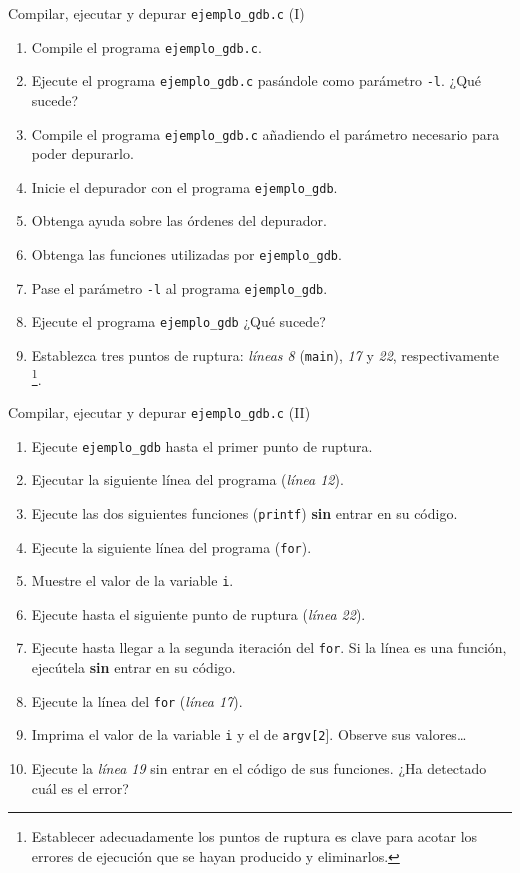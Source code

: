 \documentclass{beamer}
\newcounter{saveenumi}
\newcommand{\seti}{\setcounter{saveenumi}{\value{enumi}}}
\newcommand{\conti}{\setcounter{enumi}{\value{saveenumi}}}
\begin{document}
	\begin{frame}{Compilar, ejecutar y depurar \texttt{ejemplo\_gdb.c} (I)}
	\footnotesize{
	\begin{enumerate}
	\item Compile el programa \texttt{ejemplo\_gdb.c}. 
	\item Ejecute el programa \texttt{ejemplo\_gdb.c} pasándole como parámetro \texttt{-l}. ¿Qué sucede?
	\item Compile el programa \texttt{ejemplo\_gdb.c} añadiendo el parámetro necesario para poder depurarlo.
	\item Inicie el depurador con el programa \texttt{ejemplo\_gdb}.
	\item Obtenga ayuda sobre las órdenes del depurador.
	\item Obtenga las funciones utilizadas por \texttt{ejemplo\_gdb}.
	\item Pase el parámetro \texttt{-l} al programa \texttt{ejemplo\_gdb}.
	\item Ejecute el programa \texttt{ejemplo\_gdb} ¿Qué sucede?
	\item Establezca tres puntos de ruptura: \textit{líneas 8} (\texttt{main}), \textit{17} y \textit{22}, respectivamente \footnote{\tiny{Establecer adecuadamente los puntos de ruptura es clave para acotar los errores de ejecución que se hayan producido y eliminarlos.}}.
	
	\seti
	\end{enumerate}
	}
	\end{frame}	
	
	\begin{frame}{Compilar, ejecutar y depurar \texttt{ejemplo\_gdb.c} (II)}
	\footnotesize{
	\begin{enumerate}
	 \conti
	\item Ejecute \texttt{ejemplo\_gdb} hasta el primer punto de ruptura.
	\item Ejecutar la siguiente línea del programa (\textit{línea 12}).
	\item Ejecute las dos siguientes funciones (\texttt{printf}) \textbf{sin} entrar en su código.
	\item Ejecute la siguiente línea del programa (\texttt{for}).
	\item Muestre el valor de la variable \texttt{i}.
	\item Ejecute hasta el siguiente punto de ruptura (\textit{línea 22}).
	\item Ejecute hasta llegar a la segunda iteración del \texttt{for}. Si la línea es una función, ejecútela \textbf{sin} entrar en su código.
	\item Ejecute la línea del \texttt{for} (\textit{línea 17}).
	\item Imprima el valor de la variable \texttt{i} y el de \texttt{argv[2}]. Observe sus valores\ldots
	\item Ejecute la \textit{línea 19} sin entrar en el código de sus funciones. ¿Ha detectado cuál es el error?
	\seti
	\end{enumerate}
	}
	\end{frame}	
\end{document}
